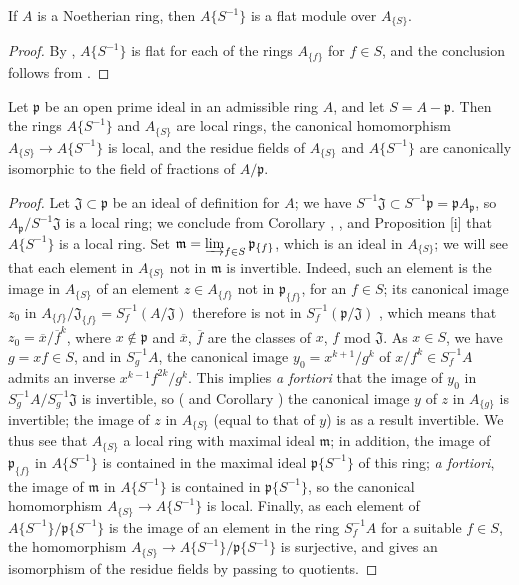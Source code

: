 \begin{proposition}[7.6.16]
\label{0.7.6.16}
If $A$ is a Noetherian ring, then $A\{S^{-1}\}$ is a flat module over $A_{\{S\}}$.
\end{proposition}

\begin{proof}
\label{proof-0.7.6.16}
By , $A\{S^{-1}\}$ is flat for each of the rings $A_{\{f\}}$ for
$f\in S$, and the conclusion follows from .
\end{proof}

\begin{proposition}[7.6.17]
\label{0.7.6.17}
Let $\mathfrak{p}$ be an open prime ideal in an admissible ring $A$, and let $S=A-\mathfrak{p}$.
Then the rings $A\{S^{-1}\}$ and $A_{\{S\}}$ are local rings, the canonical homomorphism
$A_{\{S\}}\to A\{S^{-1}\}$ is local, and the residue fields of $A_{\{S\}}$ and $A\{S^{-1}\}$ are
canonically isomorphic to the field of fractions of $A/\mathfrak{p}$.
\end{proposition}

\begin{proof}
\label{proof-0.7.6.17}
Let $\mathfrak{J}\subset\mathfrak{p}$ be an ideal of definition for $A$; we have
$S^{-1}\mathfrak{J}\subset S^{-1}\mathfrak{p}=\mathfrak{p}A_\mathfrak{p}$, so
$A_\mathfrak{p}/S^{-1}\mathfrak{J}$ is a local ring; we conclude from 
Corollary , , and
Proposition [i] that $A\{S^{-1}\}$ is a local ring. Set
$\mathfrak{m}=\varinjlim_{f\in S}\mathfrak{p}_{\{f\}}$, which is an ideal in $A_{\{S\}}$; we
will see that each element in $A_{\{S\}}$ not in $\mathfrak{m}$ is invertible. Indeed, such an
element is the image in $A_{\{S\}}$ of an element $z\in A_{\{f\}}$ not in $\mathfrak{p}_{\{f\}}$,
for an $f\in S$; its canonical image $z_0$ in
$A_{\{f\}}/\mathfrak{J}_{\{f\}}=S_f^{-1}(A/\mathfrak{J})$ therefore is not in
$S_f^{-1}(\mathfrak{p}/\mathfrak{J})$ , which means that
$z_0=\overline{x}/\overline{f}^k$, where $x\not\in\mathfrak{p}$ and $\overline{x}$, $\overline{f}$
are the classes of $x$, $f$ mod $\mathfrak{J}$. As $x\in S$, we have $g=xf\in S$, and in
$S_g^{-1}A$, the canonical image $y_0=x^{k+1}/g^k$ of $x/f^k\in S_f^{-1}A$ admits an inverse
$x^{k-1}f^{2k}/g^k$. This implies \emph{a fortiori} that the image of $y_0$ in
$S_g^{-1}A/S_g^{-1}\mathfrak{J}$ is invertible, so ( and
Corollary ) the canonical image $y$ of $z$ in $A_{\{g\}}$ is
invertible; the image of $z$ in $A_{\{S\}}$ (equal to that of $y$) is as a result invertible.
We thus see that $A_{\{S\}}$ a local ring with maximal ideal $\mathfrak{m}$; in addition, the image
of $\mathfrak{p}_{\{f\}}$ in $A\{S^{-1}\}$ is contained in the maximal ideal $\mathfrak{p}\{S^{-1}\}$
of this ring; \emph{a fortiori}, the image of $\mathfrak{m}$ in $A\{S^{-1}\}$ is contained in
$\mathfrak{p}\{S^{-1}\}$, so the canonical homomorphism $A_{\{S\}}\to A\{S^{-1}\}$ is local. Finally,
as each element of $A\{S^{-1}\}/\mathfrak{p}\{S^{-1}\}$ is the image of an element in the ring
$S_f^{-1}A$ for a suitable $f\in S$, the homomorphism $A_{\{S\}}\to A\{S^{-1}\}/\mathfrak{p}\{S^{-1}\}$
is surjective, and gives an isomorphism of the residue fields by passing to quotients.
\end{proof}

